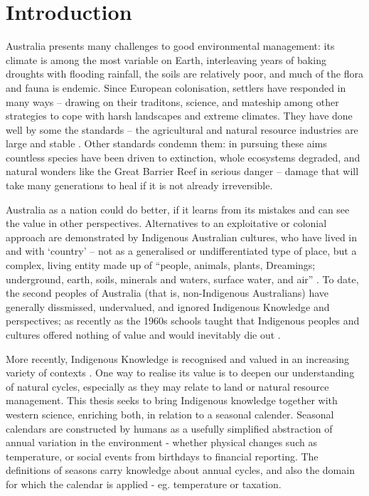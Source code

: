 \chapter{Introduction}
\label{ch:introduction}

Australia presents many challenges to good environmental management: its
climate is among the most variable on Earth, interleaving years of baking
droughts with flooding rainfall, the soils are relatively poor, and much of
the flora and fauna is endemic.
%
Since European colonisation, settlers have responded in many ways --
drawing on their traditons, science, and mateship among other strategies to cope
with harsh landscapes and extreme climates.
%
They have done well by some the standards -- the agricultural and natural
resource industries are large and stable .  Other standards condemn
them: in pursuing these aims countless species have been driven to extinction,
whole ecosystems degraded, and natural wonders like the Great Barrier Reef
in serious danger -- damage that will take many generations to heal if it is
not already irreversible.

Australia as a nation could do better, if it learns from its mistakes and can
see the value in other perspectives.  Alternatives to an exploitative or
colonial approach are demonstrated by Indigenous Australian cultures, who
have lived in and with `country' -- not as a generalised or undifferentiated
type of place, but a complex, living entity made up of ``people, animals,
plants, Dreamings; underground, earth, soils, minerals and waters, surface
water, and air'' \citep{birdrose1996}.
%
To date, the second peoples of Australia (that is, non-Indigenous Australians)
have generally dissmissed, undervalued, and ignored Indigenous Knowledge
and perspectives; as recently as the 1960s schools taught that Indigenous
peoples and cultures offered nothing of value and would inevitably die out
\citep{flannery1994}.


More recently, Indigenous Knowledge is recognised and valued in an
increasing variety of contexts \citep[eg.][]{petheram2010,cochran2015,
berkes2012}.  One way to realise its value is to deepen our understanding
of natural cycles, especially as they may relate to land or natural resource
management.  This thesis seeks to bring Indigenous knowledge together with
western science, enriching both, in relation to a seasonal calender.
%
Seasonal calendars are constructed by humans as a usefully simplified
abstraction of annual variation in the environment - whether physical
changes such as temperature, or social events from birthdays to financial
reporting.  The definitions of seasons carry knowledge about annual cycles,
and also the domain for which the calendar is applied - eg. temperature
or taxation.


